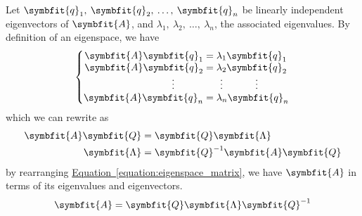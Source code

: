 \documentclass{article}
\begin{document}
\begin{solution}[Proof]
    Let \(\symbfit{q}_1,\: \symbfit{q}_2,\: \dots,\: \symbfit{q}_n\) be
    linearly independent eigenvectors of \(\symbfit{A}\), and
    \(\lambda_1,\: \lambda_2,\: \dots,\: \lambda_n\), the associated
    eigenvalues. By definition of an eigenspace, we have
    \begin{equation*}
        \left\{
        \setlength\arraycolsep{0pt}
        \begin{array}{ r >{{}}c<{{}} l }
            \symbfit{A}\symbfit{q}_1    & = & \lambda_1 \symbfit{q}_1                            \\
            \symbfit{A}\symbfit{q}_2    & = & \lambda_2 \symbfit{q}_2                            \\
            \vdotswithin{\symbfit{q}_3} &   & \vdotswithin{\lambda_3}\vdotswithin{\symbfit{q}_3} \\
            \symbfit{A}\symbfit{q}_n    & = & \lambda_n \symbfit{q}_n
        \end{array}
        \right.
    \end{equation*}
    which we can rewrite as
    \begin{align}
        \symbfit{A}\symbfit{Q} & = \symbfit{Q}\symbfit{\Lambda} \label{equation:eigenspace_matrix} \\
        \symbfit{\Lambda}      & =\symbfit{Q}^{-1}\symbfit{A}\symbfit{Q} \nonumber
    \end{align}
    by rearranging
    \hyperref[equation:eigenspace_matrix]{Equation~\ref{equation:eigenspace_matrix}},
    we have \(\symbfit{A}\) in terms of its eigenvalues and
    eigenvectors.
    \begin{equation*}
        \symbfit{A} = \symbfit{Q}\symbfit{\Lambda} \symbfit{Q}^{-1}
    \end{equation*}
\end{solution}
\end{document}
